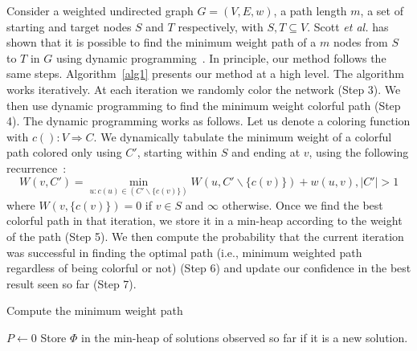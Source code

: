 \documentclass{ws-procs11x85}
\begin{document}
Consider a weighted undirected graph $G = (V, E, w)$, a path length
$m$, a set of starting and target nodes $S$ and $T$ respectively, with
$S, T \subseteq V$.  Scott {\it et al.} has shown that it is possible
to find the minimum weight path of a $m$ nodes from $S$ to $T$ in $G$
using dynamic programming~\cite{scott}. In principle, our method
follows the same steps. Algorithm~\ref{alg1} presents our method at a
high level.  The algorithm works iteratively. At each iteration we
randomly color the network (Step 3). We then use dynamic programming
to find the minimum weight colorful path (Step 4). The dynamic
programming works as follows.  Let us denote a coloring function with
$c(): V \Longrightarrow C$. We dynamically tabulate the minimum weight
of a colorful path colored only using $C'$, starting within $S$ and
ending at $v$, using the following recurrence~\cite{scott}:
\begin{equation}
  W(v, C') = \min_{u:c(u) \in (C' \backslash \{c(v)\})} W(u, C' \backslash
  \{c(v)\}) + w(u, v), |C'| > 1
\end{equation}
where $W(v, \{c(v)\}) = 0$ if $v \in S$ and $\infty$ otherwise. Once
we find the best colorful path in that iteration, we store it in a
min-heap according to the weight of the path (Step 5). We then compute
the probability that the current iteration was successful in finding
the optimal path (i.e., minimum weighted path regardless of being
colorful or not) (Step 6) and update our confidence in the best result
seen so far (Step 7).


\begin{algorithm}[tbhp]
\caption{Compute the minimum weight path}
{\footnotesize 
\begin{algorithmic}[1]
\STATE $P \leftarrow 0$
   \STATE Store $\Phi$ in the min-heap of solutions observed so far if it is a new solution.
\ENDWHILE
\end{algorithmic}
}
\label{alg1}
\end{algorithm}
\end{document}
